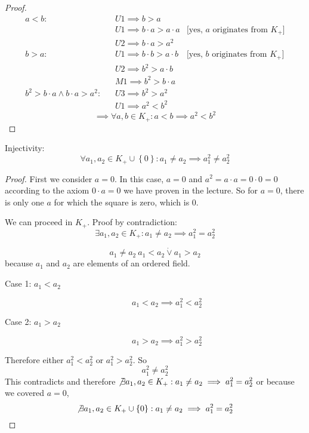 \documentclass[a4paper]{article}
\theoremstyle{definition}
\newcommand\set[1]{\left\{#1\right\}}
\begin{document}
\begin{proof}
  \begin{align*}
    a < b: \hspace{10pt}
      & U1 \implies b > a \\
      & U1 \implies b\cdot a > a\cdot a & \text{[yes, $a$ originates from $K_+$]} \\
      & U2 \implies b\cdot a > a^2 \\
    b > a: \hspace{10pt}
      & U1 \implies b\cdot b > a\cdot b & \text{[yes, $b$ originates from $K_+$]} \\
      & U2 \implies b^2 > a\cdot b \\
      & M1 \implies b^2 > b\cdot a \\
    b^2 > b\cdot a \land b\cdot a > a^2: \hspace{10pt}
      & U3 \implies b^2 > a^2 \\
      & U1 \implies a^2 < b^2
  \end{align*}
  \[ \implies \forall a, b \in K_+: a < b \implies a^2 < b^2 \]
\end{proof}

Injectivity:
\[ \forall a_1, a_2 \in K_+ \cup \set{0}: a_1 \neq a_2 \implies a_1^2 \neq a_2^2 \]

\begin{proof}
  First we consider $a = 0$. In this case, $a = 0$ and $a^2 = a \cdot a = 0 \cdot 0 = 0$
  according to the axiom $0 \cdot a = 0$ we have proven in the lecture.
  So for $a = 0$, there is only one $a$ for which the square is zero, which is $0$.

  We can proceed in $K_+$. Proof by contradiction:
  \[ \exists a_1, a_2 \in K_+: a_1 \neq a_2 \implies a_1^2 = a_2^2 \]

  \[
    a_1 \neq a_2 \ a_1 < a_2 \dot\lor a_1 > a_2
  \]
  because $a_1$ and $a_2$ are elements of an ordered field.

  \begin{description}
    \item[Case 1: $a_1 < a_2$]
      \[ a_1 < a_2 \implies a_1^2 < a_2^2 \]
    \item[Case 2: $a_1 > a_2$]
      \[ a_1 > a_2 \implies a_1^2 > a_2^2 \]
  \end{description}

  Therefore either $a_1^2 < a_2^2$ or $a_1^2 > a_2^2$. So
  \[ a_1^2 \neq a_2^2 \]
  This contradicts and therefore $\not\exists a_1, a_2 \in K_+: a_1 \neq a_2 \implies a_1^2 = a_2^2$
  or because we covered $a = 0$,
  \[ \not\exists a_1, a_2 \in K_+ \cup \set{0}: a_1 \neq a_2 \implies a_1^2 = a_2^2 \]
\end{proof}
\end{document}
